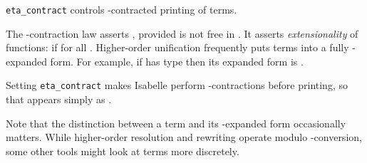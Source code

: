 \begin{isabellebody}
\begin{isamarkuptext}
\begin{description}
  \item \verb|eta_contract| controls -contracted printing of
  terms.

  The -contraction law asserts ,
  provided  is not free in .  It asserts
  \emph{extensionality} of functions:  if  for all .  Higher-order unification frequently puts
  terms into a fully -expanded form.  For example, if  has type  then its expanded form is .

  Setting \verb|eta_contract| makes Isabelle perform -contractions before printing, so that 
  appears simply as .

  Note that the distinction between a term and its -expanded
  form occasionally matters.  While higher-order resolution and
  rewriting operate modulo -conversion, some other tools
  might look at terms more discretely.


\end{description}
\end{isamarkuptext}
\end{isabellebody}
